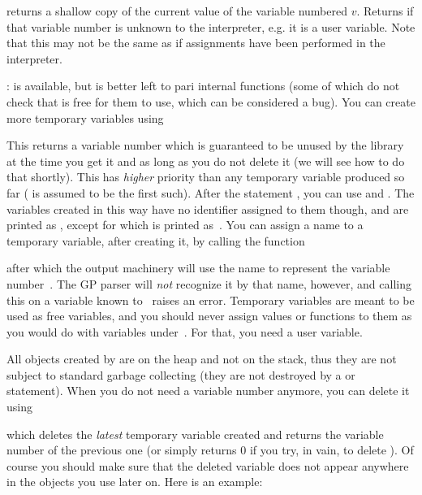  returns a shallow copy of the current
value of the variable numbered $v$. Returns  if that variable
number is unknown to the interpreter,  e.g. it is a user variable. Note
that this may not be the same as  if assignments have been
performed in the interpreter.

:
 is available, but is better left to pari internal functions
(some of which do not check that  is free for them to use,
which can be considered a bug). You can create more temporary variables
using

\label{se:fetch_var}

\noindent
This returns a variable number which is guaranteed to be unused by the
library at the time you get it and as long as you do not delete it (we will
see how to do that shortly). This has \emph{higher} priority than any
temporary variable produced so far ( is assumed to be the first
such). After the statement , you can use
 and . The variables created in this way have no
identifier assigned to them though, and are printed as
, except for  which is printed
as~\kbd{\#}. You can assign a name to a temporary variable, after creating
it, by calling the function


\noindent after which the output machinery will use the name  to
represent the variable number~. The GP parser will \emph{not}
recognize it by that name, however, and calling this on a variable known
to~ raises an error. Temporary variables are meant to be used as free
variables, and you should never assign values or functions to them as you
would do with variables under~. For that, you need a user variable.

All objects created by  are on the heap and not on the stack,
thus they are not subject to standard garbage collecting (they are not
destroyed by a  or  statement). When you do
not need a variable number anymore, you can delete it using


\noindent which deletes the \emph{latest} temporary variable created and
returns the variable number of the previous one (or simply returns 0 if you
try, in vain, to delete ). Of course you should make sure that
the deleted variable does not appear anywhere in the objects you use later
on. Here is an example:

